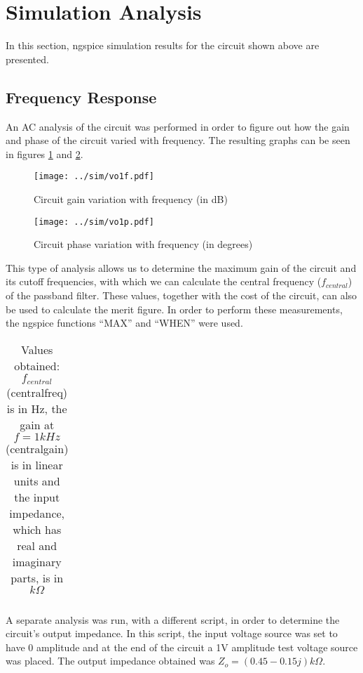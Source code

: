 \newpage
\section{Simulation Analysis}
\label{sec:simulation}

In this section, ngspice simulation results for the circuit shown above are presented.

\subsection{Frequency Response}

An AC analysis of the circuit was performed in order to figure out how the gain and phase of the circuit varied with frequency. The resulting graphs can be seen in figures \ref{fig:gain_freq} and \ref{fig:phase_freq}.

\begin{figure}[H] \centering
\texttt{[image: ../sim/vo1f.pdf]}
\caption{Circuit gain variation with frequency (in dB)}
\label{fig:gain_freq}
\end{figure}

\begin{figure}[H] \centering
\texttt{[image: ../sim/vo1p.pdf]}
\caption{Circuit phase variation with frequency (in degrees)}
\label{fig:phase_freq}
\end{figure}

This type of analysis allows us to determine the maximum gain of the circuit and its cutoff frequencies, with which we can calculate the central frequency ($f_{central}$) of the passband filter. These values, together with the cost of the circuit, can also be used to calculate the merit figure. In order to perform these measurements, the ngspice functions ``MAX'' and ``WHEN'' were used.

\begin{table}[H]
  \centering
  \begin{tabular}{|c|c|}
    \hline
      
  \end{tabular}
  \caption{Values obtained: $f_{central}$ (centralfreq) is in Hz, the gain at $f = 1 kHz$ (centralgain) is in linear units and the input impedance, which has real and imaginary parts, is in $k\Omega$}
  \label{tab:resultssim}
\end{table}

A separate analysis was run, with a different script, in order to determine the circuit's output impedance. In this script, the input voltage source was set to have 0 amplitude and at the end of the circuit a 1V amplitude test voltage source was placed. The output impedance obtained was $Z_o = (0.45 - 0.15j) k\Omega$.





